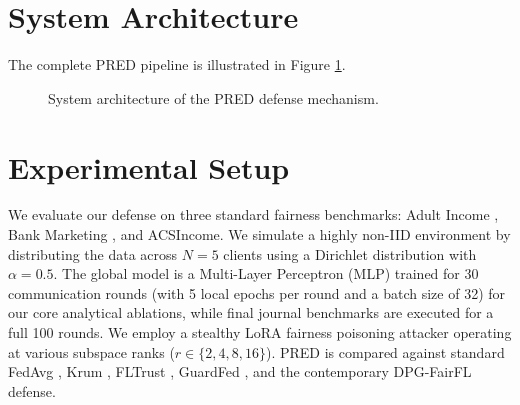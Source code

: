 \documentclass[journal]{IEEEtran}
\begin{document}
\section{System Architecture}
The complete PRED pipeline is illustrated in Figure \ref{fig:architecture}.

\begin{figure}[htbp]
\centering
{}
\caption{System architecture of the PRED defense mechanism.}
\label{fig:architecture}
\end{figure}

\section{Experimental Setup}
We evaluate our defense on three standard fairness benchmarks: Adult Income \cite{ding2021retiring}, Bank Marketing \cite{moro2014data}, and ACSIncome. We simulate a highly non-IID environment by distributing the data across $N=5$ clients using a Dirichlet distribution with $\alpha=0.5$. The global model is a Multi-Layer Perceptron (MLP) trained for 30 communication rounds (with 5 local epochs per round and a batch size of 32) for our core analytical ablations, while final journal benchmarks are executed for a full 100 rounds. We employ a stealthy LoRA fairness poisoning attacker \cite{lorafl2024} operating at various subspace ranks ($r \in \{2, 4, 8, 16\}$). PRED is compared against standard FedAvg \cite{mcmahan2017communication}, Krum \cite{blanchard2017machine}, FLTrust \cite{cao2021fltrust}, GuardFed \cite{guardfed2024}, and the contemporary DPG-FairFL \cite{dpgfairfl2025} defense.
\end{document}
